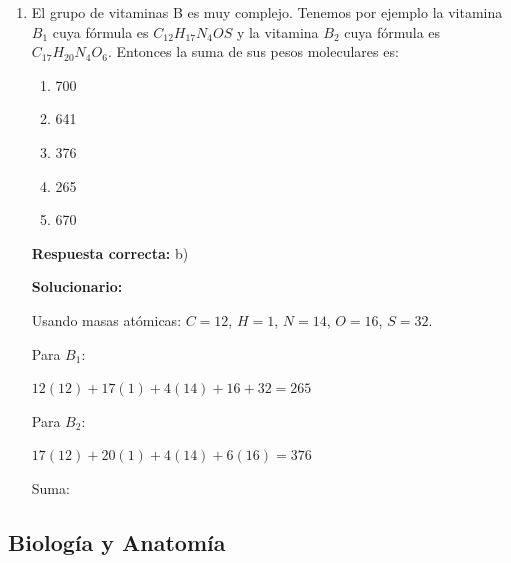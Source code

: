 \begin{enumerate}[resume]
	\vspace{2mm}
	\textbf{Solucionario:}
	
	Se identifica como cadena principal una de 11 carbonos, es decir, un undecano. Al numerar para obtener el menor conjunto de localizadores, se observan tres metilos en 2, 3 y 6, y un isobutil en 7. Por ello, el nombre correcto es:
	
	$\text{7-isobutil-2,3,6-trimetilundecano}$
	
	\vspace{6mm}
	
	\item El grupo de vitaminas B es muy complejo. Tenemos por ejemplo la vitamina $B_1$ cuya fórmula es $C_{12}H_{17}N_4OS$ y la vitamina $B_2$ cuya fórmula es $C_{17}H_{20}N_4O_6$. Entonces la suma de sus pesos moleculares es:
	\begin{enumerate}[label=\alph*)]
		\item 700
		\item 641
		\item 376
		\item 265
		\item 670
	\end{enumerate}
	\textbf{Respuesta correcta:} b)
	
	\vspace{2mm}
	\textbf{Solucionario:}
	
	Usando masas atómicas: $C=12$, $H=1$, $N=14$, $O=16$, $S=32$.
	
	Para $B_1$:
	
	$12(12)+17(1)+4(14)+16+32=265$
	
	Para $B_2$:
	
	$17(12)+20(1)+4(14)+6(16)=376$
	
	Suma:
	
	
	\vspace{6mm}
	
\end{enumerate}

\subsection*{Biología y Anatomía}

